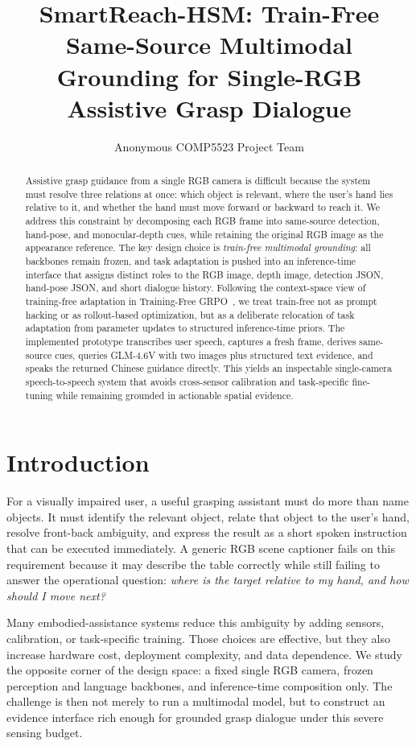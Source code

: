 \documentclass[10pt,twocolumn,letterpaper]{article}
\title{SmartReach-HSM: Train-Free Same-Source Multimodal Grounding for Single-RGB Assistive Grasp Dialogue}
\author{Anonymous COMP5523 Project Team}
\date{}
\begin{document}
\maketitle

\begin{abstract}
Assistive grasp guidance from a single RGB camera is difficult because the system must resolve three relations at once: which object is relevant, where the user's hand lies relative to it, and whether the hand must move forward or backward to reach it. We address this constraint by decomposing each RGB frame into same-source detection, hand-pose, and monocular-depth cues, while retaining the original RGB image as the appearance reference. The key design choice is \emph{train-free multimodal grounding}: all backbones remain frozen, and task adaptation is pushed into an inference-time interface that assigns distinct roles to the RGB image, depth image, detection JSON, hand-pose JSON, and short dialogue history. Following the context-space view of training-free adaptation in Training-Free GRPO~\cite{cai2025tfgrpo}, we treat train-free not as prompt hacking or as rollout-based optimization, but as a deliberate relocation of task adaptation from parameter updates to structured inference-time priors. The implemented prototype transcribes user speech, captures a fresh frame, derives same-source cues, queries GLM-4.6V with two images plus structured text evidence, and speaks the returned Chinese guidance directly. This yields an inspectable single-camera speech-to-speech system that avoids cross-sensor calibration and task-specific fine-tuning while remaining grounded in actionable spatial evidence.
\end{abstract}

\section{Introduction}
For a visually impaired user, a useful grasping assistant must do more than name objects. It must identify the relevant object, relate that object to the user's hand, resolve front-back ambiguity, and express the result as a short spoken instruction that can be executed immediately. A generic RGB scene captioner fails on this requirement because it may describe the table correctly while still failing to answer the operational question: \emph{where is the target relative to my hand, and how should I move next?}

Many embodied-assistance systems reduce this ambiguity by adding sensors, calibration, or task-specific training. Those choices are effective, but they also increase hardware cost, deployment complexity, and data dependence. We study the opposite corner of the design space: a fixed single RGB camera, frozen perception and language backbones, and inference-time composition only. The challenge is then not merely to run a multimodal model, but to construct an evidence interface rich enough for grounded grasp dialogue under this severe sensing budget.
\end{document}
